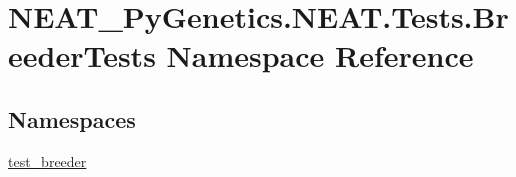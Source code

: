 \hypertarget{namespaceNEAT__PyGenetics_1_1NEAT_1_1Tests_1_1BreederTests}{}\section{N\+E\+A\+T\+\_\+\+Py\+Genetics.\+N\+E\+A\+T.\+Tests.\+Breeder\+Tests Namespace Reference}
\label{namespaceNEAT__PyGenetics_1_1NEAT_1_1Tests_1_1BreederTests}
\subsection*{Namespaces}
\begin{DoxyCompactItemize}
\item 
 \hyperlink{namespaceNEAT__PyGenetics_1_1NEAT_1_1Tests_1_1BreederTests_1_1test__breeder}{test\+\_\+breeder}
\end{DoxyCompactItemize}
